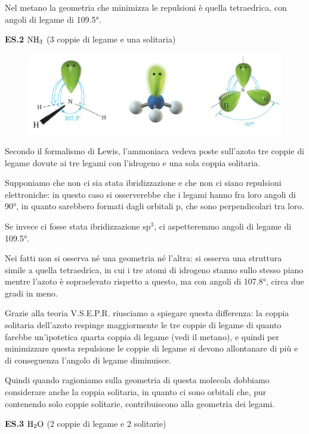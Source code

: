 \vspace{0.2cm}Nel metano la geometria che minimizza le repulsioni è quella tetraedrica, con angoli di legame di 109.5°.

\vspace{0.2cm}\textbf{ES.2} $\rm NH_3$ (3 coppie di legame e una solitaria)

\begin{figure}[H]
    \centering
    \includegraphics[width=12cm]{immagini/ammoniaca.png}
\end{figure}
    
Secondo il formalismo di Lewis, l'ammoniaca vedeva poste sull'azoto tre coppie di legame dovute ai tre legami con l'idrogeno e una sola coppia solitaria.

Supponiamo che non ci sia stata ibridizzazione e che non ci siano repulsioni elettroniche: in questo caso si osserverebbe che i legami hanno fra loro angoli di 90°, in quanto sarebbero formati dagli orbitali p, che sono perpendicolari tra loro.
    
Se invece ci fosse stata ibridizzazione sp$^3$, ci aspetteremmo angoli di legame di 109.5°.
    
Nei fatti non si osserva né una geometria né l'altra: si osserva una struttura simile a quella tetraedrica, in cui i tre atomi di idrogeno stanno sullo stesso piano mentre l'azoto è sopraelevato rispetto a questo, ma con angoli di 107.8°, circa due gradi in meno.
    
Grazie alla teoria V.S.E.P.R. riusciamo a spiegare questa differenza: la coppia solitaria dell'azoto respinge maggiormente le tre coppie di legame di quanto farebbe un'ipotetica quarta coppia di legame (vedi il metano), e quindi per minimizzare questa repulsione le coppie di legame si devono allontanare di più e di conseguenza l'angolo di legame diminuisce.

Quindi quando ragioniamo sulla geometria di questa molecola dobbiamo considerare anche la coppia solitaria, in quanto ci sono orbitali che, pur contenendo solo coppie solitarie, contribuiscono alla geometria dei legami.

\vspace{0.2cm}\textbf{ES.3} $\rm H_2O$ (2 coppie di legame e 2 solitarie)

